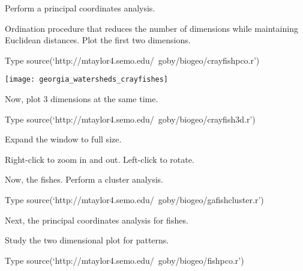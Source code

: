 \documentclass[t]{beamer}
\begin{document}
\begin{frame}[plain]{Perform a principal coordinates analysis.}

\hangpara Ordination procedure that reduces the number of dimensions while maintaining Euclidean distances. Plot the first two dimensions.

\begin{block}{Type}
	source(`http://mtaylor4.semo.edu/~goby/biogeo/crayfishpco.r')
\end{block}


\end{frame}

{
\begin{frame}[plain]
\end{frame}
}

\begin{frame}[plain]
	\centering
	\texttt{[image: georgia\_watersheds\_crayfishes]}
\end{frame}


\begin{frame}[plain]{Now, plot 3 dimensions at the same time.}

\begin{block}{Type}
	source(`http://mtaylor4.semo.edu/~goby/biogeo/crayfish3d.r')
\end{block}

	\hangpara Expand the window to full size. 
	
	\hangpara Right-click to zoom in and out. Left-click to rotate.

\end{frame}

\begin{frame}[plain]{Now, the fishes. Perform a cluster analysis.}

\begin{block}{Type}
	source(`http://mtaylor4.semo.edu/~goby/biogeo/gafishcluster.r')
\end{block}
\end{frame}

{
\begin{frame}[plain]
\end{frame}
}


\begin{frame}[plain]{Next, the principal coordinates analysis for fishes.}

\hangpara Study the two dimensional plot for patterns.

\begin{block}{Type}
	source(`http://mtaylor4.semo.edu/~goby/biogeo/fishpco.r')
\end{block}
\end{frame}
\end{document}
